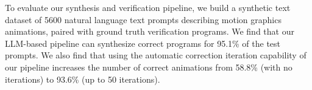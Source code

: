 To evaluate our synthesis and verification pipeline, we build a
synthetic text dataset of 5600 natural language text prompts describing
motion graphics animations, paired with ground truth \dslname{}
verification programs. We find that our LLM-based pipeline can
synthesize correct \dslname{} programs for 95.1\% of the test
prompts. We also find that using the automatic correction iteration capability of
our pipeline increases the number of correct animations from 58.8\%
(with no iterations) to 93.6\% (up to 50 iterations). 






  
  



